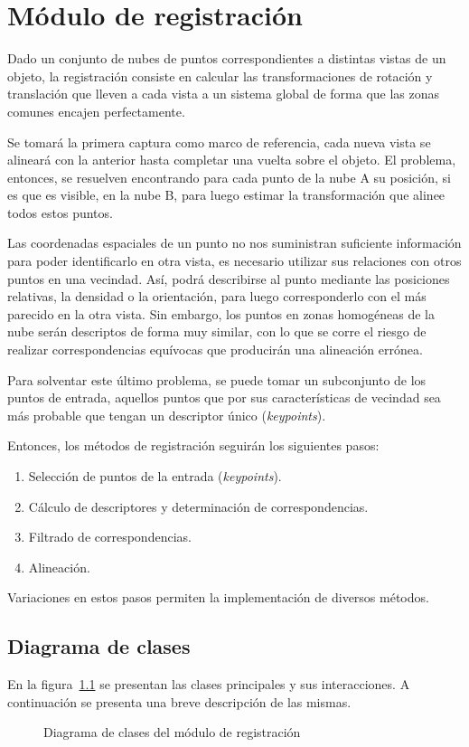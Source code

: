 \chapter{Módulo de registración}
	Dado un conjunto de nubes de puntos correspondientes a distintas vistas de
	un objeto, la registración consiste en calcular las transformaciones de
	rotación y translación que lleven a cada vista a un sistema global de forma
	que las zonas comunes encajen perfectamente.

	Se tomará la primera captura como marco de referencia, cada nueva vista se
	alineará con la anterior hasta completar una vuelta sobre el objeto.
	El problema, entonces, se resuelven encontrando para cada punto de la nube
	A su posición, si es que es visible, en la nube B, para luego estimar la
	transformación que alinee todos estos puntos.

	Las coordenadas espaciales de un punto no nos suministran suficiente
	información para poder identificarlo en otra vista, es necesario utilizar
	sus relaciones con otros puntos en una vecindad.
	Así, podrá describirse al punto mediante las posiciones relativas, la
	densidad o la orientación, para luego corresponderlo con el más parecido en
	la otra vista.
	Sin embargo, los puntos en zonas homogéneas de la nube serán descriptos de
	forma muy similar, con lo que se corre el riesgo de realizar
	correspondencias equívocas que producirán una alineación errónea.

	Para solventar este último problema, se puede tomar un subconjunto de los
	puntos de entrada, aquellos puntos que por sus características de vecindad
	sea más probable que tengan un descriptor único (\emph{keypoints}).

	Entonces, los métodos de registración seguirán los siguientes pasos:
	\begin{enumerate}
		\item Selección de puntos de la entrada (\emph{keypoints}).
		\item Cálculo de descriptores y determinación de correspondencias.
		\item Filtrado de correspondencias.
		\item Alineación.
	\end{enumerate}
	Variaciones en estos pasos permiten la implementación de diversos métodos.

	\section{Diagrama de clases}
		En la figura~\ref{fig:align_class} se presentan las clases principales y sus interacciones.
		A continuación se presenta una breve descripción de las mismas.
		\begin{figure}
			\caption{\label{fig:align_class}Diagrama de clases del módulo de registración}
		\end{figure}

